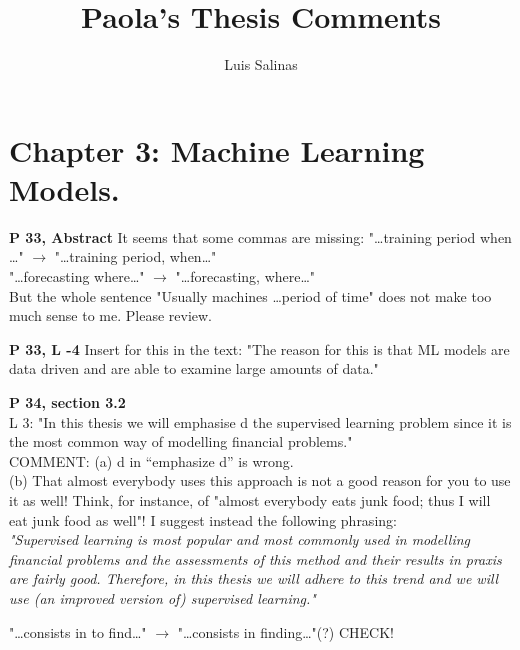\documentclass[12pt,reqno]{amsart}
\title[Paola's Thesis Comments]{Paola's Thesis Comments}
\author[L. Salinas]{Luis Salinas}
\def\blue#1{{\color{blue} #1}}
\def\green#1{{\color{green} #1}}
\def\red#1{{\color{red} #1}}
\begin{document}
\maketitle%

\section{Chapter 3: Machine Learning Models.}

\def\myitem#1{ \item[\blue{\bf #1}] }

\begin{description}[style=unboxed,leftmargin=0cm,itemsep=3ex]

\myitem{P 33, Abstract}
It seems that some commas are missing:
"\dots training period when \dots" 
\quad$\longrightarrow$\quad
"\dots training period, when\dots" \\
"\dots forecasting where\dots"
\quad$\longrightarrow$\quad
"\dots forecasting, where\dots" \\
But the whole sentence "Usually machines \dots period of time"
does not make too much sense to me. Please review.

\myitem{P 33, L -4}
Insert \red{for this} in the text:
"The reason \red{for this} is that ML models are data driven and are
able to examine large amounts of data."

\myitem{P 34, section 3.2}\mbox{}\\
\blue{L 3:}\quad
"In this thesis we will emphasise\red{d} the supervised learning
problem since it is the most common way of modelling financial problems."\\
\blue{COMMENT:}\quad
(a) \red{d} in ``emphasize\red{d}'' is wrong. \\
(b) That almost everybody uses this approach is not a good reason for you
to use it as well!
Think, for instance, of "almost everybody eats junk food; thus I will
eat junk food as well"!
I suggest instead the following phrasing: \\
\green{\em "Supervised learning is most popular and most commonly used
in modelling financial problems and the assessments of this method and
their results in praxis are fairly good. Therefore, in this thesis we
will adhere to this trend and we will use (an improved version of)
supervised learning."}

\vspace{1ex}\blue{L 5:}\quad
"\dots consists in to find\dots"
\quad$\longrightarrow$\quad
"\dots consists in finding\dots"\quad (?)  CHECK!


\end{description}
\end{document}
